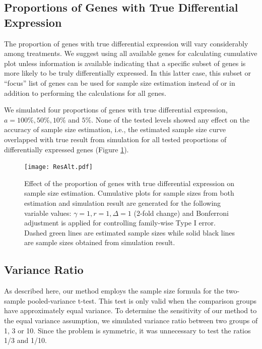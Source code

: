 \documentclass[12pt]{article}
\begin{document}
\subsection{Proportions of Genes with True Differential Expression}

The proportion of genes with true differential expression will vary
considerably among treatments. We suggest using all available genes
for calculating cumulative plot unless information is available
indicating that a specific subset of genes is more likely to be
truly differentially expressed. In this latter case, this subset or
``focus'' list of genes can be used for sample size estimation
instead of or in addition to performing the calculations for all
genes.

We simulated four proportions of genes with true differential
expression, $a = 100\%, 50\%, 10\%$ and $5\%$. None of the tested
levels showed any effect on the accuracy of sample size
estimation, i.e., the estimated sample size curve overlapped with
true result from simulation for all tested proportions of
differentially expressed genes (Figure \ref{fig:ResAlt}).

\begin{figure}%
  \caption[Effect of the proportion of genes with true differential
    expression on sample size estimation] {Effect of the proportion of
    genes with true differential expression on sample size estimation.
    Cumulative plots for sample sizes from both estimation and
    simulation result are generated for the following variable values:
    $\gamma = 1, r = 1, \Delta = 1$ (2-fold change) and Bonferroni
    adjustment is applied for controlling family-wise Type I error. Dashed green
    lines are estimated sample sizes while solid black lines are
    sample sizes obtained from simulation result.}
  \label{fig:ResAlt}
  \centerline{\texttt{[image: ResAlt.pdf]}}
\end{figure}

\subsection{Variance Ratio}

As described here, our method employs the sample size formula for
the two-sample pooled-variance t-test.  This test
is only valid when the comparison groups have approximately equal
variance. To determine the sensitivity of our method to the equal
variance assumption, we simulated variance ratio between two groups
of 1, 3 or 10.  Since the problem is symmetric, it was unnecessary
to test the ratios 1/3 and 1/10.
\end{document}
